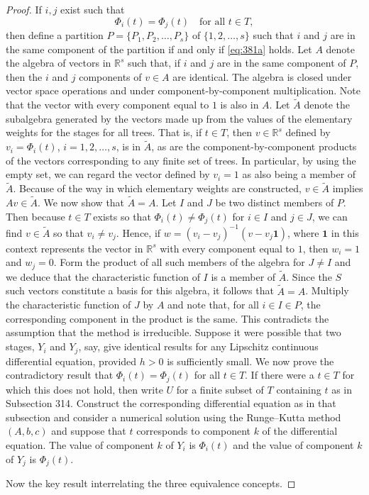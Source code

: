 \begin{proof}
If $i, j$ exist such that
\[
\Phi_i(t) = \Phi_j(t) \quad \text{for all } t \in T, \tag{381a}
\]
then define a partition $P = \{P_1, P_2, \dots, P_s\}$ of $\{1, 2, \dots, s\}$ such that $i$ and $j$ are in the same component of the partition if and only if \eqref{eq:381a} holds.
Let $A$ denote the algebra of vectors in $\mathbb{R}^s$ such that, if $i$ and $j$ are in the same component of $P$, then the $i$ and $j$ components of $v \in A$ are identical.
The algebra is closed under vector space operations and under component-by-component multiplication. Note that the vector with every component equal to $1$ is also in $A$. Let $\widetilde{A}$ denote the subalgebra generated by the vectors made up from the values of the elementary weights for the stages for all trees. That is, if $t \in T$, then $v \in \mathbb{R}^s$ defined by $v_i = \Phi_i(t)$, $i = 1, 2, \dots, s$, is in $\widetilde{A}$, as are the component-by-component products of the vectors corresponding to any finite set of trees. In particular, by using the empty set, we can regard the vector defined by $v_i = 1$ as also being a member of $\widetilde{A}$. Because of the way in which elementary weights are constructed, $v \in \widetilde{A}$ implies $Av \in \widetilde{A}$. We now show that $\widetilde{A} = A$. Let $I$ and $J$ be two distinct members of $P$. Then because $t \in T$ exists so that $\Phi_i(t) \neq \Phi_j(t)$ for $i \in I$ and $j \in J$, we can find $v \in \widetilde{A}$ so that $v_i \neq v_j$. Hence, if $w = (v_i - v_j)^{-1}(v - v_j \mathbf{1})$, where $\mathbf{1}$ in this context represents the vector in $\mathbb{R}^s$ with every component equal to $1$, then $w_i = 1$ and $w_j = 0$. Form the product of all such members of the algebra for $J \neq I$ and we deduce that the characteristic function of $I$ is a member of $\widetilde{A}$. Since the $S$ such vectors constitute a basis for this algebra, it follows that $\widetilde{A} = A$. Multiply the characteristic function of $J$ by $A$ and note that, for all $i \in I \in P$, the corresponding component in the product is the same. This contradicts the assumption that the method is irreducible. Suppose it were possible that two stages, $Y_i$ and $Y_j$, say, give identical results for any Lipschitz continuous differential equation, provided $h > 0$ is sufficiently small. We now prove the contradictory result that $\Phi_i(t) = \Phi_j(t)$ for all $t \in T$. If there were a $t \in T$ for which this does not hold, then write $U$ for a finite subset of $T$ containing $t$ as in Subsection 314. Construct the corresponding differential equation as in that subsection and consider a numerical solution using the Runge--Kutta method $(A, b, c)$ and suppose that $t$ corresponds to component $k$ of the differential equation. The value of component $k$ of $Y_i$ is $\Phi_i(t)$ and the value of component $k$ of $Y_j$ is $\Phi_j(t)$.

Now the key result interrelating the three equivalence concepts.
\end{proof}

